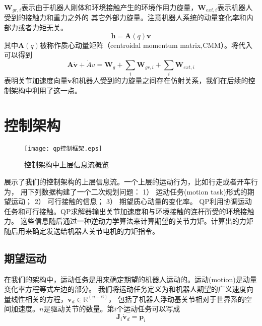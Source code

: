 ${\boldsymbol{W}}_{gr,i}$表示由于机器人刚体和环境接触产生的环境作用力旋量，${\boldsymbol{W}}_{ext,i}$表示机器人受到的接触力和重力之外的
其它外部力旋量。注意机器人系统的动量变化率和内部力或者力矩无关。
\begin{equation}
    \label{equ:euler_linear_equ}
    \boldsymbol{h}=\boldsymbol{A}(q)\boldsymbol{v}
\end{equation}
其中$\boldsymbol{A}(q)$被称作质心动量矩阵（centroidal momentum matrix,CMM）。将代入可以得到
\begin{equation}
    \label{equ:euler_wrench}
    \boldsymbol{A}\dot{\boldsymbol{v}}+\dot{A}v={{\boldsymbol{W}}_{g}}+\sum\limits_{i}{{{\boldsymbol{W}}_{gr,i}}}
    +\sum\limits_{i}{{{\boldsymbol{W}}_{ext,i}}}
\end{equation}
表明关节加速度向量$\dot{\boldsymbol{v}}$和机器人受到的力旋量之间存在仿射关系，我们在后续的控制架构中利用了这一点。

\section{控制架构}
\label{sec:controller}
\begin{figure}[htbp]
    \centering
    \texttt{[image: qp控制框架.eps]}
    \caption{\label{fig:framework_control_flow}控制架构中上层信息流概览}
\end{figure}
展示了我们的控制架构的上层信息流。一个上层的运动行为，比如行走或者开车行为，
用下列数据构建了一个二次规划问题：
1）	运动任务(motion task)形式的期望运动；
2）	可行接触的信息；
3）	期望质心动量的变化率。
QP利用协调运动任务和可行接触。QP求解器输出关节加速度和与环境接触的连杆所受的环境接触力。
这些信息随后通过一种逆动力学算法来计算期望的关节力矩。计算出的力矩随后用来确定发送给机器人关节电机的力矩指令。
\subsection{期望运动}
在我们的架构中，运动任务是用来确定期望的机器人运动的。运动(motion)是动量变化率方程等式左边的部分。
我们将运动任务定义为和机器人期望的广义速度向量线性相关的方程，${\dot{\boldsymbol{v}}}_{d}\in {\mathbb{R}}^{(n+6)}$，
包括了机器人浮动基关节相对于世界系的空间加速度。$n$是驱动关节的数量。第$i$个运动任务可以写成
\begin{equation}
    \label{equ:motion_task}
    \boldsymbol{J}_i \dot {\boldsymbol{v}}_d = \boldsymbol{p}_i
\end{equation}


